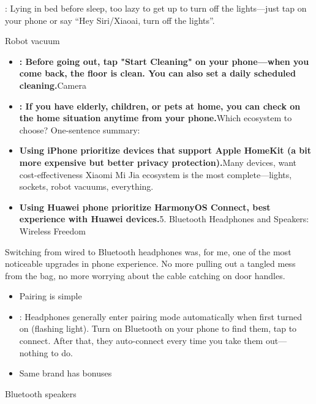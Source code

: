
: Lying in bed before sleep, too lazy to get up to turn off the lights—just tap on your phone or say “Hey Siri/Xiaoai, turn off the lights”.

Robot vacuum

\begin{itemize}
  \item \textbf{: Before going out, tap "Start Cleaning" on your phone—when you come back, the floor is clean. You can also set a daily scheduled cleaning.}Camera
  \item \textbf{: If you have elderly, children, or pets at home, you can check on the home situation anytime from your phone.}Which ecosystem to choose? One-sentence summary:
  \item \textbf{Using iPhone prioritize devices that support Apple HomeKit (a bit more expensive but better privacy protection).}Many devices, want cost-effectiveness Xiaomi Mi Jia ecosystem is the most complete—lights, sockets, robot vacuums, everything.
  \item \textbf{Using Huawei phone prioritize HarmonyOS Connect, best experience with Huawei devices.}5. Bluetooth Headphones and Speakers: Wireless Freedom
\end{itemize}

Switching from wired to Bluetooth headphones was, for me, one of the most noticeable upgrades in phone experience. No more pulling out a tangled mess from the bag, no more worrying about the cable catching on door handles.

\begin{itemize}
  \item Pairing is simple
  \item : Headphones generally enter pairing mode automatically when first turned on (flashing light). Turn on Bluetooth on your phone to find them, tap to connect. After that, they auto-connect every time you take them out—nothing to do.
  \item Same brand has bonuses
\end{itemize}


Bluetooth speakers

